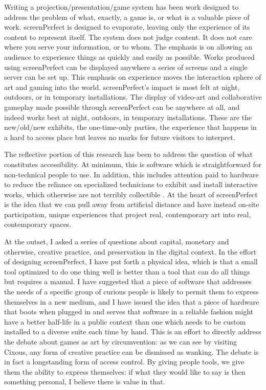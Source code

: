 Writing a projection/presentation/game system has been work designed to address the problem of what, exactly, a game is, or what is a valuable piece of work. screenPerfect is designed to evaporate, leaving only the experience of its content to represent itself. The system does not judge content. It does not care where you serve your information, or to whom. The emphasis is on allowing an audience to experience things as quickly and easily as possible. Works produced using screenPerfect can be displayed anywhere a series of screens and a single server can be set up. This emphasis on experience moves the interaction sphere of art and gaming into the world. screenPerfect's impact is most felt at night, outdoors, or in temporary installations. The display of video-art and collaborative gameplay made possible through screenPerfect can be anywhere at all, and indeed works best at night, outdoors, in temporary installations. These are the new/old/new exhibits, the one-time-only parties, the experience that happens in a hard to access place but leaves no marks for future visitors to interpret.

The reflective portion of this research has been to address the question of what constitutes accessibility. At minimum, this is software which is straightforward for non-technical people to use. In addition, this includes attention paid to hardware to reduce the reliance on specialized technicians to exhibit and install interactive works, which otherwise are not terribly collectible \cite{lisanotes}. At the heart of screenPerfect is the idea that we can pull away from artificial distance and have instead on-site participation, unique experiences that project real, contemporary art into real, contemporary spaces.

At the outset, I asked a series of questions about capital, monetary and otherwise, creative practice, and preservation in the digital context. In the effort of designing screenPerfect, I have put forth a physical idea, which is that a small tool optimized to do one thing well is better than a tool that can do all things but requires a manual. I have suggested that a piece of software that addresses the needs of a specific group of curious people is likely to permit them to express themselves in a new medium, and I have issued the idea that a piece of hardware that boots when plugged in and serves that software in a reliable fashion might have a better half-life in a public context than one which needs to be custom installed to a diverse suite each time by hand. This is an effort to directly address the debate about games as art by circumvention: as we can see by visiting Cixous, any form of creative practice can be dismissed as wanking. The debate is in fact a longstanding form of access control. By giving people tools, we give them the ability to express themselves: if what they would like to say is then something personal, I believe there is value in that.

